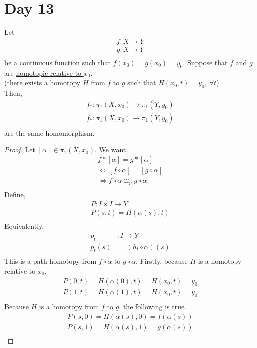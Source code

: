 \section{Day 13}
    \begin{theorem} 
        Let
        \begin{align*}
            f: X\rightarrow Y\\
            g: X\rightarrow Y\\
        \end{align*}
        be a continuous function such that $f(x_0)=g(x_0)=y_0$. Suppose that
        $f$ and $g$ are \underline{homotopic relative to $x_0$}.\\(there exists a homotopy
        $H$ from $f$ to $g$ such that $H(x_0, t)=y_0,\ \forall t$).\\
        Then,
        \begin{align*}
            f_*:\pi_1(X,x_0)\rightarrow \pi_1(Y,y_0)\\
            f_*:\pi_1(X,x_0)\rightarrow \pi_1(Y,y_0)\\
        \end{align*}
        are the same homomorphism.
    \end{theorem} 
    \begin{proof}
        Let $[\alpha]\in \pi_1(X,x_0)$. We want,
        \begin{align*}
            f*[\alpha]=g*[\alpha]\\
            \iff [f\circ \alpha]=[g\circ \alpha]\\
            \iff f\circ \alpha \cong_{p} g\circ\alpha\\
        \end{align*}
        Define,
        \begin{align*}
            P: I\times I \rightarrow Y\\
            P(s,t)=H(\alpha(s), t)\\
        \end{align*}
        Equivalently, 
        \begin{align*}
            p_t&: I \rightarrow Y\\
            p_t(s)&=(h_t\circ \alpha)(s)\\
        \end{align*}
        This is a path homotopy from $f\circ \alpha$ to $g\circ\alpha$.
        Firstly, because $H$ is a homotopy relative to $x_0$.
        \begin{align*}
            P(0,t)=H(\alpha(0),t)=H(x_0,t)=y_0\\
            P(1,t)=H(\alpha(1),t)=H(x_0,t)=y_0\\
        \end{align*}
        Because $H$ is a homotopy from $f$ to $g$, the following is true.
        \begin{align*}
            P(s,0)=H(\alpha(s),0)=f(\alpha(s))\\
            P(s,1)=H(\alpha(s),1)=g(\alpha(s))\\
        \end{align*}
    \end{proof}
